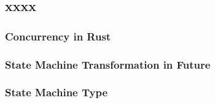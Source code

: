 \subsection{xxxx} %
\begin{frame}[fragile]
    \frametitle{Concurrency in Rust}
\end{frame}
% 
% 
% 
% 
% 
\begin{frame}[fragile]
    \frametitle{State Machine Transformation in Future}
\end{frame}
% 
% 
% 
% 
% 
% 
\begin{frame}[fragile]
    \frametitle{State Machine Type}
\end{frame}
